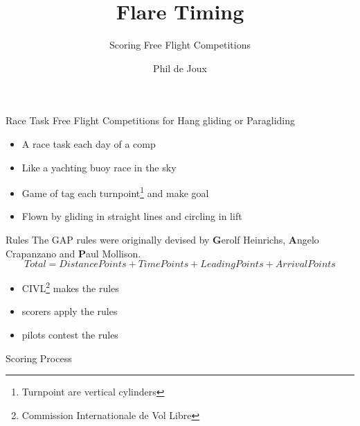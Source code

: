 \documentclass{beamer}
\title{Flare Timing}
\subtitle{Scoring Free Flight Competitions}
\author{Phil de Joux}
\institute{Block Scope}
\date{}
\begin{document}
\begin{frame}
\titlepage
\end{frame}

\begin{frame}{Race Task}
    Free Flight Competitions for Hang gliding or Paragliding
\begin{itemize}
    \item A race task each day of a comp
    \item Like a yachting buoy race in the sky
    \item Game of tag each turnpoint\footnote{Turnpoint are vertical cylinders} and make goal
    \item Flown by gliding in straight lines and circling in lift
\end{itemize}
\end{frame}


\begin{frame}{Rules}
The GAP rules were originally devised by \textbf{G}erolf Heinrichs, \textbf{A}ngelo Crapanzano and \textbf{P}aul Mollison.
\[ Total = DistancePoints + TimePoints + LeadingPoints + ArrivalPoints \]
    
\begin{itemize}
    \item CIVL\footnote{Commission Internationale de Vol Libre} makes the rules
    \item scorers apply the rules
    \item pilots contest the rules
\end{itemize}
\end{frame}

\begin{frame}{Scoring Process}
\begin{figure}[!ht]
    \centering
    
    \label{fig:scoring-process}
\end{figure}
\end{frame}
\end{document}
